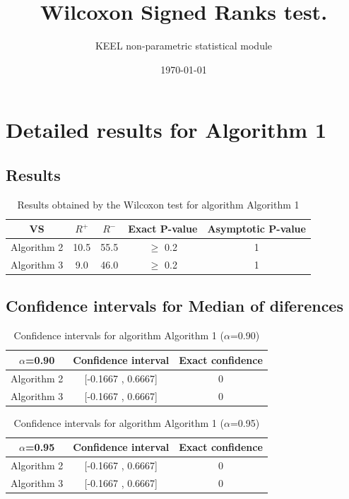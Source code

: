 \documentclass[a4paper,10pt]{article}
\title{Wilcoxon Signed Ranks test.}
\date{\today}
\author{KEEL non-parametric statistical module}
\begin{document}
\pagestyle{empty}
\maketitle
\thispagestyle{empty}



\section{Detailed results for Algorithm 1}


\subsection{Results}

\begin{table}[!htp]
\centering\small
\begin{tabular}{
|c|c|c|c|c|}
\hline
 VS & $R^{+}$ & $R^{-}$ & Exact P-value & Asymptotic P-value \\ \hline 
Algorithm 2 & 10.5 & 55.5 & $\geq$ 0.2 & 1\\ \hline 
Algorithm 3 & 9.0 & 46.0 & $\geq$ 0.2 & 1\\ \hline 

\end{tabular}
\caption{Results obtained by the Wilcoxon test for algorithm Algorithm 1}
\end{table}

\subsection{Confidence intervals for Median of diferences}

\begin{table}[!htp]
\centering\small
\begin{tabular}{
|c|c|c|}
\hline
 $\alpha$=0.90 & Confidence interval & Exact confidence \\ \hline 
Algorithm 2 & [-0.1667 , 0.6667] & 0\\ \hline 
Algorithm 3 & [-0.1667 , 0.6667] & 0\\ \hline 

\end{tabular}
\caption{Confidence intervals for algorithm Algorithm 1 ($\alpha$=0.90)}
\end{table}
\begin{table}[!htp]
\centering\small
\begin{tabular}{
|c|c|c|}
\hline
 $\alpha$=0.95 & Confidence interval & Exact confidence \\ \hline 
Algorithm 2 & [-0.1667 , 0.6667] & 0\\ \hline 
Algorithm 3 & [-0.1667 , 0.6667] & 0\\ \hline 

\end{tabular}
\caption{Confidence intervals for algorithm Algorithm 1 ($\alpha$=0.95)}
\end{table}
\end{document}
